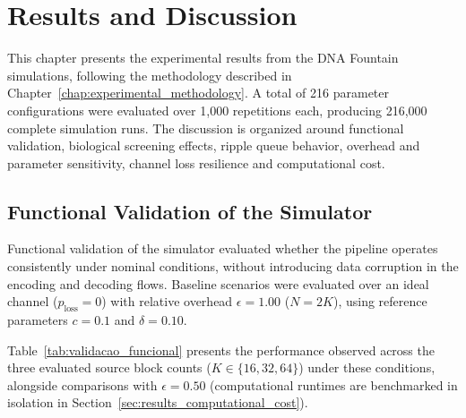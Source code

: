 \chapter{Results and Discussion}
\label{chap:results}

This chapter presents the experimental results from the DNA Fountain simulations, following the methodology described in Chapter~\ref{chap:experimental_methodology}. A total of 216 parameter configurations were evaluated over 1,000 repetitions each, producing 216,000 complete simulation runs. The discussion is organized around functional validation, biological screening effects, ripple queue behavior, overhead and parameter sensitivity, channel loss resilience and computational cost.

\section{Functional Validation of the Simulator}
\label{sec:results_functional_validation}

Functional validation of the simulator evaluated whether the pipeline operates consistently under nominal conditions, without introducing data corruption in the encoding and decoding flows. Baseline scenarios were evaluated over an ideal channel ($p_{\text{loss}} = 0$) with relative overhead $\epsilon = 1.00$ ($N = 2K$), using reference parameters $c = 0.1$ and $\delta = 0.10$.

Table~\ref{tab:validacao_funcional} presents the performance observed across the three evaluated source block counts ($K \in \{16, 32, 64\}$) under these conditions, alongside comparisons with $\epsilon = 0.50$ (computational runtimes are benchmarked in isolation in Section~\ref{sec:results_computational_cost}).

